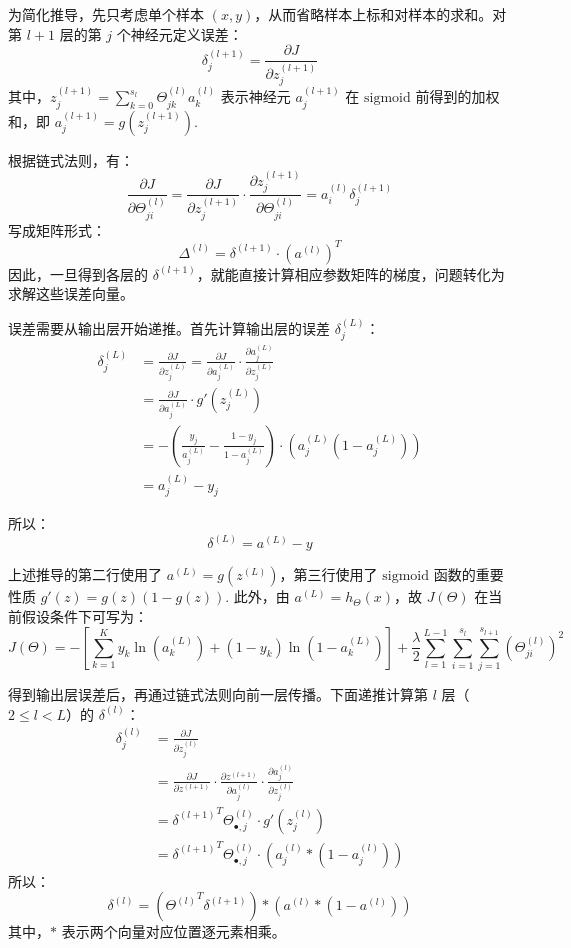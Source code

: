 为简化推导，先只考虑单个样本 $(x,y)$，从而省略样本上标和对样本的求和。对第 $l+1$ 层的第 $j$ 个神经元定义误差：
\[
\delta_j^{(l+1)}=\frac{\partial J}{\partial z_j^{(l+1)}}
\]
其中，$z_j^{(l+1)}=\sum\limits_{k=0}^{s_{l}}\Theta^{(l)}_{jk}a^{(l)}_{k}$ 表示神经元 $a_j^{(l+1)}$ 在 $\text{sigmoid}$ 前得到的加权和，即 $a^{(l+1)}_j=g\left(z_j^{(l+1)}\right)$.

根据链式法则，有：
\[
\frac{\partial J}{\partial \Theta^{(l)}_{ji}}=\frac{\partial J}{\partial z_j^{(l+1)}}\cdot\frac{\partial z_j^{(l+1)}}{\partial\Theta_{ji}^{(l)}}=a_i^{(l)}\delta_j^{(l+1)}
\]
写成矩阵形式：
\[
\boxed{\Delta^{(l)}=\delta^{(l+1)}\cdot(a^{(l)})^T}
\]
因此，一旦得到各层的 $\delta^{(l+1)}$，就能直接计算相应参数矩阵的梯度，问题转化为求解这些误差向量。

误差需要从输出层开始递推。首先计算输出层的误差 $\delta_j^{(L)}$：
\begin{align*}
\delta_j^{(L)}&=\frac{\partial J}{\partial z_j^{(L)}}=\frac{\partial J}{\partial a_j^{(L)}}\cdot\frac{\partial a_j^{(L)}}{\partial z_j^{(L)}}\\
&=\frac{\partial J}{\partial a_j^{(L)}}\cdot g'\left(z_j^{(L)}\right)\\
&=-\left(\frac{y_j}{a_j^{(L)}}-\frac{1-y_j}{1-a_j^{(L)}}\right)\cdot\left(a_j^{(L)}(1-a_j^{(L)})\right)\\
&=a_j^{(L)}-y_j
\end{align*}

所以：
\[
\boxed{\delta^{(L)}=a^{(L)}-y}
\]

\begin{note}
上述推导的第二行使用了 $a^{(L)}=g(z^{(L)})$，第三行使用了 $\text{sigmoid}$ 函数的重要性质 $g'(z)=g(z)(1-g(z))$. 此外，由 $a^{(L)}=h_\Theta(x)$，故 $J(\Theta)$ 在当前假设条件下可写为：
\[
J(\Theta)=-\left[\sum_{k=1}^Ky_k\ln(a^{(L)}_k)+(1-y_k)\ln(1-a_k^{(L)})\right]+\frac{\lambda}{2}\sum_{l=1}^{L-1}\sum_{i=1}^{s_l}\sum_{j=1}^{s_{l+1}}\left(\Theta_{ji}^{(l)}\right)^2
\]
\end{note}

得到输出层误差后，再通过链式法则向前一层传播。下面递推计算第 $l$ 层（$2\leqslant l<L$）的 $\delta^{(l)}$：
\begin{align*}
\delta_j^{(l)}&=\frac{\partial J}{\partial z_j^{(l)}}\\
&=\frac{\partial J}{\partial z^{(l+1)}}\cdot\frac{\partial z^{(l+1)}}{\partial a_j^{(l)}}\cdot\frac{\partial a_j^{(l)}}{\partial z_j^{(l)}}\\
&={\delta^{(l+1)}}^T\Theta^{(l)}_{\bullet,j}\cdot g'(z_j^{(l)})\\
&={\delta^{(l+1)}}^T\Theta^{(l)}_{\bullet,j}\cdot \left(a_j^{(l)}*(1-a_j^{(l)})\right)
\end{align*}
所以：
\[
\boxed{\delta^{(l)}=\left({\Theta^{(l)}}^T\delta^{(l+1)}\right)*\left(a^{(l)}*(1-a^{(l)})\right)}
\]
其中，$*$ 表示两个向量对应位置逐元素相乘。



